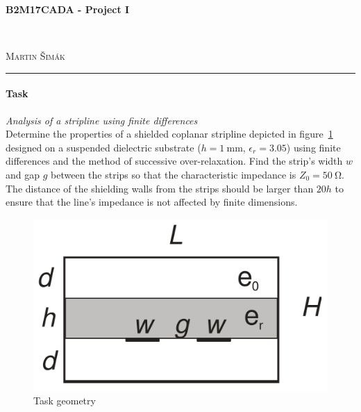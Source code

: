 \documentclass[11pt,a4paper]{article}
\begin{document}

\begin{center}
    {\LARGE\textbf{B2M17CADA - Project I}}\\[3mm]
    \begin{minipage}{0.4\textwidth}
        \begin{flushleft}
            \textsc{}
        \end{flushleft}
    \end{minipage}
    ~
    \begin{minipage}{0.4\textwidth}
        \begin{flushright}
            \textsc{Martin Šimák}
        \end{flushright}
    \end{minipage}
    \noindent\rule{14.5cm}{0.4pt}
\end{center}

\paragraph{Task} \emph{Analysis of a stripline using finite differences}\\
Determine the properties of a shielded coplanar stripline depicted in figure~\ref{fig:task-geometry} designed on a suspended dielectric substrate ($h = 1~\mathrm{mm}$, $\epsilon_r = 3.05$) using finite differences and the method of successive over-relaxation. Find the strip's width $w$ and gap $g$ between the strips so that the characteristic impedance is $Z_0 = 50~\mathrm{\Omega}$. The distance of the shielding walls from the strips should be larger than $20h$ to ensure that the line's impedance is not affected by finite dimensions.
\begin{figure}[!ht]
    \centering
    \includegraphics[width=.4\textwidth]{src/task-geometry.png}
    \caption{Task geometry}
    \label{fig:task-geometry}
\end{figure}
\end{document}
